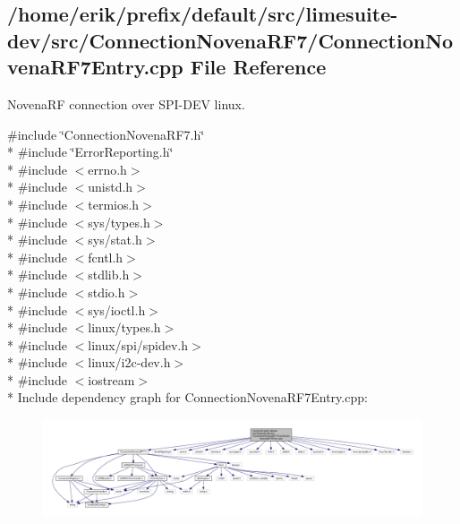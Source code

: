 \subsection{/home/erik/prefix/default/src/limesuite-\/dev/src/\+Connection\+Novena\+R\+F7/\+Connection\+Novena\+R\+F7\+Entry.cpp File Reference}
\label{ConnectionNovenaRF7Entry_8cpp}


Novena\+RF connection over S\+P\+I-\/\+D\+EV linux.  


{\ttfamily \#include \char`\"{}Connection\+Novena\+R\+F7.\+h\char`\"{}}\\*
{\ttfamily \#include \char`\"{}Error\+Reporting.\+h\char`\"{}}\\*
{\ttfamily \#include $<$errno.\+h$>$}\\*
{\ttfamily \#include $<$unistd.\+h$>$}\\*
{\ttfamily \#include $<$termios.\+h$>$}\\*
{\ttfamily \#include $<$sys/types.\+h$>$}\\*
{\ttfamily \#include $<$sys/stat.\+h$>$}\\*
{\ttfamily \#include $<$fcntl.\+h$>$}\\*
{\ttfamily \#include $<$stdlib.\+h$>$}\\*
{\ttfamily \#include $<$stdio.\+h$>$}\\*
{\ttfamily \#include $<$sys/ioctl.\+h$>$}\\*
{\ttfamily \#include $<$linux/types.\+h$>$}\\*
{\ttfamily \#include $<$linux/spi/spidev.\+h$>$}\\*
{\ttfamily \#include $<$linux/i2c-\/dev.\+h$>$}\\*
{\ttfamily \#include $<$iostream$>$}\\*
Include dependency graph for Connection\+Novena\+R\+F7\+Entry.\+cpp\+:
\nopagebreak
\begin{figure}[H]
\begin{center}
\leavevmode
\includegraphics[width=350pt]{d3/db9/ConnectionNovenaRF7Entry_8cpp__incl}
\end{center}
\end{figure}
